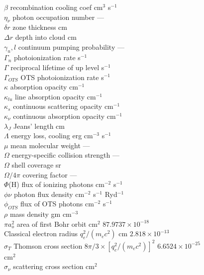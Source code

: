 \begin{tabbing}
$\beta$ \>  recombination cooling coef \>  cm$^3$ s$^{-1}$\\
$\eta_\nu$ \>  photon occupation number \> ---\\
$\delta r$ \>  zone thickness \>  cm\\
$\Delta r$ \>  depth into cloud \>  cm\\
$\gamma_u,l$ \>  continuum pumping probability \> ---\\
$\Gamma_n$ \>  photoionization rate \>  s$^{-1}$\\
$\Gamma$ \>  reciprocal
lifetime of up level \>  s$^{-1}$\\
$\Gamma_{OTS}$ \>  OTS photoionization rate \>   s$^{-1}$\\
$\kappa$ \>  absorption opacity \>
cm$^{-1}$\\
$\kappa_{lu}$ \>  line absorption opacity \>  cm$^{-1}$\\
$\kappa_s$ \>  continuous scattering opacity \>  cm$^{-1}$\\
$\kappa_\nu$ \>  continuous absorption opacity \>  cm$^{-1}$\\
$\lambda_J$ \>  Jeans' length \>   cm\\
$\Lambda$ \>  energy loss,
cooling \>  erg cm$^{-3}$ s$^{-1}$\\
$\mu$ \>  mean molecular weight \> ---\\
$\Omega$ \>  energy-specific collision strength \> --- \\
$\Omega$ \>  shell coverage \>  sr\\
$\Omega/4\pi$ \>  covering factor \> ---\\
$\Phi$(H) \>  flux of ionizing
photons \>   cm$^{-2}$ s$^{-1}$\\
$\phi\nu$ \>  photon flux density \>  cm$^{-2}$ s$^{-1}$ Ryd$^{-1}$\\
$\phi_{OTS}$ \>  flux of OTS photons \>
cm$^{-2}$ s$^{-1}$\\
$\rho$ \>  mass density \>  gm cm$^{-3}$\\
$\pi a_o^2$ \>  area of first Bohr
orbit \>  cm$^2$ \>  $87.9737\times10^{-18}$\\
 \> Classical electron radius \> $q_e^2/( {{m_e}{c^2}}
)$
 cm \>  $2.818\times10^{-13}$\\
$\sigma_T$ \>  Thomson cross section \>  $8\pi /3 \times {\left[ {q_e^2/(
{{m_e}{c^2}})} \right]^2}$ \>
 $6.6524\times 10^{-25}$\\
 \>  \> cm$^2$\\
$\sigma_\nu$ \>  scattering cross section \>   cm$^2$\\

\end{tabbing}

